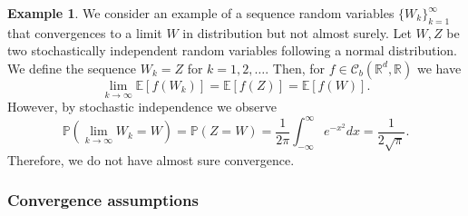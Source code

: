 \documentclass[12pt]{article}
\theoremstyle{definition}
\newtheorem{example}[example]{Example}
\numberwithin{equation}{section}
\newcommand{\R}{\mathbb{R}}
\newcommand{\BP}{\mathbb{P}}
\newcommand{\CC}{\mathcal{C}}
\newcommand{\ev}[1]{\mathbb{E}\left[{#1}\right]}
\begin{document}
\begin{example}
  We consider an example of a sequence random variables $\{W_k\}_{k=1}^\infty$ that convergences to a limit $W$ in distribution but not almost surely.
  Let $W,Z$ be two stochastically independent random variables following a normal distribution. We define the sequence $W_k = Z$ for $k=1,2,\dots$. Then, for $f \in \CC_b(\R^d, \R)$ we have
  \begin{equation*}
    \lim_{k \rightarrow \infty} \ev{f(W_k)} = \ev{f(Z)} = \ev{f(W)}.
  \end{equation*}
  However, by stochastic independence we observe
  \begin{equation*}
    \BP(\lim_{k \rightarrow \infty} W_k = W) = \BP(Z = W) = \frac{1}{2\pi}\int_{-\infty}^\infty e^{-x^2} dx = \frac{1}{2\sqrt{\pi}}.
  \end{equation*}
  Therefore, we do not have almost sure convergence.
\end{example}
\subsubsection{Convergence assumptions}
\end{document}
